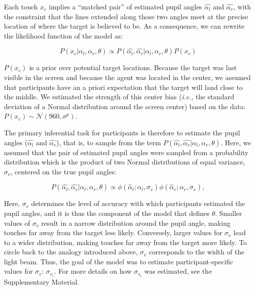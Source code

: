 \documentclass[
  man,floatsintext]{apa7}
\begin{document}
Each touch \(x_c\) implies a ``matched pair'' of estimated pupil angles \(\hat{\alpha_l}\) and \(\hat{\alpha_r}\), with the constraint that the lines extended along those two angles meet at the precise location of where the target is believed to be. As a consequence, we can rewrite the likelihood function of the model as:

\begin{equation}
P(x_c | \alpha_l, \alpha_r, \theta) \propto P(\hat{\alpha_l}, \hat{\alpha_r} | \alpha_l, \alpha_r, \theta) P(x_c)
\end{equation}

\(P(x_c)\) is a prior over potential target locations. Because the target was last visible in the screen and because the agent was located in the center, we assumed that participants have an a priori expectation that the target will land close to the middle. We estimated the strength of this center bias (\emph{i.e.,} the standard deviation of a Normal distribution around the screen center) based on the data: \(P(x_c) \sim \mathcal{N}(960, \sigma^p)\).

The primary inferential task for participants is therefore to estimate the pupil angles (\(\hat{\alpha_l}\) and \(\hat{\alpha_r}\)), that is, to sample from the term \(P(\hat{\alpha_l}, \hat{\alpha_r} | \alpha_l, \alpha_r, \theta)\). Here, we assumed that the pair of estimated pupil angles were sampled from a probability distribution which is the product of two Normal distributions of equal variance, \(\sigma_v\), centered on the true pupil angles:

\begin{equation}
P(\hat{\alpha_l}, \hat{\alpha_r} | \alpha_l, \alpha_r, \theta) \propto \phi(\hat{\alpha}_l ; \alpha_l, \sigma_v)\phi(\hat{\alpha}_r ; \alpha_r, \sigma_v),
\end{equation}

Here, \(\sigma_v\) determines the level of accuracy with which participants estimated the pupil angles, and it is thus the component of the model that defines \(\theta\). Smaller values of \(\sigma_v\) result in a narrow distribution around the pupil angle, making touches far away from the target less likely. Conversely, larger values for \(\sigma_v\) lead to a wider distribution, making touches far away from the target more likely. To circle back to the analogy introduced above, \(\sigma_v\) corresponds to the width of the light beam. Thus, the goal of the model was to estimate participant-specific values for \(\sigma_v\): \(\sigma_{v_i}\). For more details on how \(\sigma_{v_i}\) was estimated, see the Supplementary Material.
\end{document}
